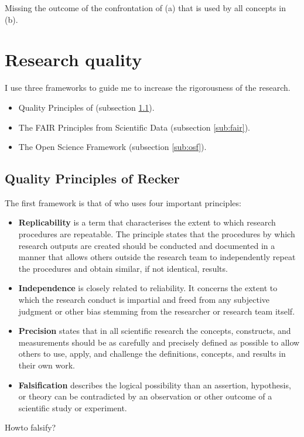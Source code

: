 \begin{remark}
	Missing the outcome of the confrontation of (a) that is used by all concepts in (b).
\end{remark}
\section{Research quality}
\label{sec:researchquality}
I use three frameworks to guide me to increase the rigorousness of the research.
\begin{itemize}
	\item{Quality Principles of \textcite{Recker2013} (subsection \ref{sub:recker}).}
	\item{The FAIR Principles from Scientific Data (subsection \ref{sub:fair}).}
	\item{The Open Science Framework (subsection \ref{sub:osf}).}
\end{itemize}
\subsection{Quality Principles of Recker}
\label{sub:recker}
The first framework is that of \textcite[p. 16-17]{Recker2013} who uses four important principles:
\begin{itemize}
	\item{\textbf{Replicability} is a term that characterises the extent to which research procedures are repeatable. The principle states that the procedures by which research outputs are created should be conducted and documented in a manner that allows others outside the research team to independently repeat the procedures and obtain similar, if not identical, results.}
	\item{\textbf{Independence} is closely related to reliability. It concerns the extent to which the research conduct is impartial and freed from any subjective judgment or other bias stemming from the researcher or research team itself.}
	\item{\textbf{Precision} states that in all scientific research the concepts, constructs, and measurements should be as carefully and precisely defined as possible to allow others to use, apply, and challenge the definitions, concepts, and results in their own work.}
	\item{\textbf{Falsification} describes the logical possibility than an assertion, hypothesis, or theory can be contradicted by an observation or other outcome of a scientific study or experiment.}
\end{itemize}
\begin{remark}
	Howto falsify? 
\end{remark}
